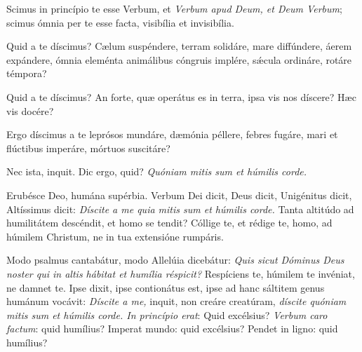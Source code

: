 {\noindent Scimus in princípio te esse Verbum, et \emph{Verbum apud Deum, et Deum Verbum}; scimus ómnia per te esse facta, visibília et invisibília.

\noindent Quid a te díscimus? Cælum suspéndere, terram solidáre, mare diffúndere, áerem expándere, ómnia eleménta animálibus cóngruis implére, sǽcula ordináre, rotáre témpora?

\noindent Quid a te díscimus? An forte, quæ operátus es in terra, ipsa vis nos díscere? Hæc vis docére?

\noindent Ergo díscimus a te leprósos mundáre, dæmónia péllere, febres fugáre, mari et flúctibus imperáre, mórtuos suscitáre?

\noindent Nec ista, inquit. Dic ergo, quid? \emph{Quóniam mitis sum et húmilis corde.}

\noindent Erubésce Deo, humána supérbia. Verbum Dei dicit, Deus dicit, Unigénitus dicit, Altíssimus dicit: \emph{Díscite a me quia mitis sum et húmilis corde.} Tanta altitúdo ad humilitátem descéndit, et homo se tendit? Cóllige te, et rédige te, homo, ad húmilem Christum, ne in tua extensióne rumpáris.

\noindent Modo psalmus cantabátur, modo Allelúia dicebátur: \emph{Quis sicut Dóminus Deus noster qui in altis hábitat et humília réspicit?} Respíciens te, húmilem te invéniat, ne damnet te. Ipse dixit, ipse contionátus est, ipse ad hanc sáltitem genus humánum vocávit: \emph{Díscite a me,} inquit, non creáre creatúram, \emph{díscite quóniam mitis sum et húmilis corde. In princípio erat}: Quid excélsius? \emph{Verbum caro factum}: quid humílius? Imperat mundo: quid excélsius? Pendet in ligno: quid humílius?

\vfill
\pagebreak

 

\vspace{-5mm}


\vfill
\pagebreak
}
\newcommand{\benedictus}{\pars{Canticum Zachariæ.}  \scriptura{Mt. 11, 25}

\vspace{-4mm}

\antiphona{I a\textsuperscript{3}}{temporalia/ant-confiteortibipater.gtex}

\vspace{-2mm}

\scriptura{Lc. 1, 68-79}

\vspace{-2mm}

\cantusSineNeumas
\initiumpsalmi{temporalia/benedictus-initium-isoll-a5-auto.gtex}

\vspace{-1.5mm}

 \Abardot{}}


